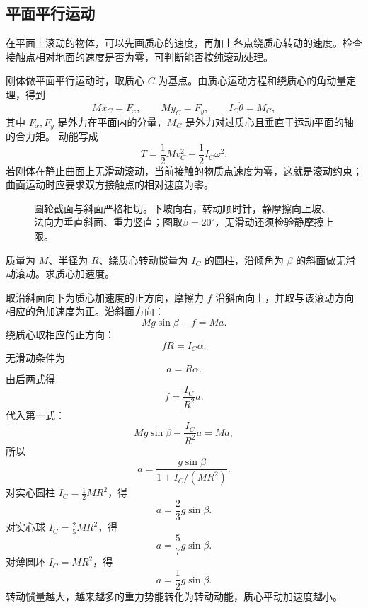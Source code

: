 \subsection{平面平行运动}

在平面上滚动的物体，可以先画质心的速度，再加上各点绕质心转动的速度。检查接触点相对地面的速度是否为零，可判断能否按纯滚动处理。

刚体做平面平行运动时，取质心 \(C\) 为基点。由质心运动方程和绕质心的角动量定理，得到
\begin{equation}
M\ddot x_C=F_x,\qquad
M\ddot y_C=F_y,\qquad
I_C\ddot\theta=M_C,
\label{eq:planar-motion-equations}
\end{equation}
其中 \(F_x,F_y\) 是外力在平面内的分量，\(M_C\) 是外力对过质心且垂直于运动平面的轴的合力矩。
动能写成
\begin{equation}
T=\frac12Mv_C^2+\frac12I_C\omega^2.
\label{eq:planar-kinetic-energy}
\end{equation}
若刚体在静止曲面上无滑动滚动，当前接触的物质点速度为零，这就是滚动约束；曲面运动时应要求双方接触点的相对速度为零。

\begin{figure}[htbp]
\centering
{}
\caption{圆轮截面与斜面严格相切。下坡向右，转动顺时针，静摩擦向上坡、法向力垂直斜面、重力竖直；图取$\beta=20^\circ$，无滑动还须检验静摩擦上限。}
\label{fig:rolling-cylinder}
\end{figure}

\begin{example}[圆柱沿斜面滚下]
质量为 \(M\)、半径为 \(R\)、绕质心转动惯量为 \(I_C\) 的圆柱，沿倾角为 \(\beta\) 的斜面做无滑动滚动。求质心加速度。

取沿斜面向下为质心加速度的正方向，摩擦力 \(f\) 沿斜面向上，并取与该滚动方向相应的角加速度为正。沿斜面方向：
\[
Mg\sin\beta-f=Ma.
\]
绕质心取相应的正方向：
\[
fR=I_C\alpha.
\]
无滑动条件为
\[
a=R\alpha.
\]
由后两式得
\[
f=\frac{I_C}{R^2}a.
\]
代入第一式：
\[
Mg\sin\beta-\frac{I_C}{R^2}a=Ma,
\]
所以
\[
a=\frac{g\sin\beta}{1+I_C/(MR^2)}.
\]
对实心圆柱 \(I_C=\frac12MR^2\)，得
\[
a=\frac23g\sin\beta.
\]
对实心球 \(I_C=\frac25MR^2\)，得
\[
a=\frac57g\sin\beta.
\]
对薄圆环 \(I_C=MR^2\)，得
\[
a=\frac12g\sin\beta.
\]
转动惯量越大，越来越多的重力势能转化为转动动能，质心平动加速度越小。
\end{example}

